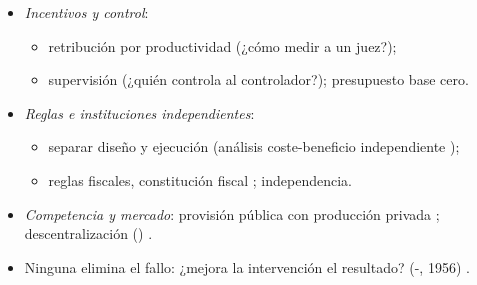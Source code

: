 \documentclass{article}
\begin{document}
\begin{columnas}
\begin{itemize}
\item \emph{Incentivos y control}:
  \begin{itemize}
  \item retribución por productividad (¿cómo medir a un juez?);
  \item supervisión (¿quién controla al controlador?); presupuesto base cero.
  \end{itemize}
\item \emph{Reglas e instituciones independientes}:
  \begin{itemize}
  \item separar diseño y ejecución (análisis coste-beneficio independiente );
  \item reglas fiscales, constitución fiscal ; independencia.
  \end{itemize}
\item \emph{Competencia y mercado}: provisión pública con producción privada ; descentralización () .
\item Ninguna elimina el fallo: ¿mejora la intervención el resultado?  (-, 1956) .
\end{itemize}


\end{columnas}
\end{document}
